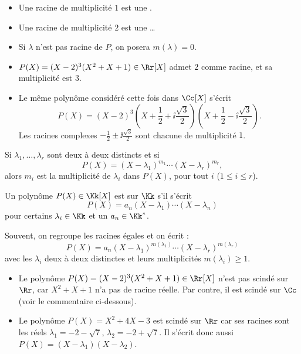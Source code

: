 \documentclass[12pt, class=report,crop=false]{standalone}
\begin{document}
\begin{itemize}

  \item Une racine de multiplicité $1$ est une .
  \item Une racine de multiplicité $2$ est une \ldots   
  \item Si $\lambda$ n'est pas racine de $P$, on posera $m(\lambda)=0$.
  
\end{itemize}  
  
  
\begin{exemple}
\sauteligne
\begin{itemize}
  \item $P(X) = (X-2)^3(X^2+X+1) \in \Rr[X]$ admet $2$ comme racine, et sa multiplicité est $3$.
  \item Le même polynôme considéré cette fois dans $\Cc[X]$ s'écrit 
  $$P(X) = (X-2)^3 \left(X+\frac12+\ii\frac{\sqrt{3}}{2}\right)\left(X+\frac12-\ii\frac{\sqrt{3}}{2}\right).$$
  Les racines complexes $-\frac12\pm\ii\frac{\sqrt{3}}{2}$ sont chacune de multiplicité $1$.
\end{itemize}
\end{exemple}

\begin{exemple}
Si $\lambda_1,\ldots,\lambda_r$ sont deux à deux distincts et si
\[P(X) =(X-\lambda_1)^{m_1}\cdots(X-\lambda_r)^{m_r},\]
alors $m_i$ est la multiplicité de $\lambda_i$ dans $P(X)$, pour tout $i$ ($1\le i\le r$). 
\end{exemple}



\begin{definition}
Un polynôme $P(X) \in \Kk[X]$ est  sur $\Kk$ 
s'il s'écrit 
\[P(X) = a_n(X-\lambda_1)\cdots(X-\lambda_n)\]
pour certains $\lambda_i \in \Kk$ et un $a_n \in \Kk^*$.

\end{definition}

Souvent, on regroupe les racines égales et on écrit :
\[P(X) = a_n(X-\lambda_1)^{m(\lambda_1)}\cdots(X-\lambda_r)^{m(\lambda_r)}\]
avec les $\lambda_i$ deux à deux distinctes et leurs multiplicités $m(\lambda_i)  \ge 1$.


\begin{exemple}
\sauteligne
\begin{itemize}
  \item Le polynôme $P(X) = (X-2)^3(X^2+X+1) \in \Rr[X]$ n'est pas scindé sur $\Rr$, car $X^2+X+1$ n'a pas de racine réelle. Par contre, il est scindé sur $\Cc$ (voir le commentaire ci-dessous).
  
  \item Le polynôme $P(X) = X^2+4X-3$ est scindé sur $\Rr$ car ses racines sont les réels
  $\lambda_1 = -2 - \sqrt{7}$, $\lambda_2 = -2 + \sqrt{7}$. Il s'écrit donc aussi $P(X) = (X-\lambda_1)(X-\lambda_2)$.  
\end{itemize}
\end{exemple}
\end{document}

